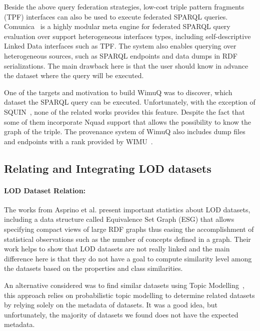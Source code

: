 \documentclass[sw]{iosart2x}
\begin{document}
Beside the above query federation strategies, low-cost triple pattern fragments (TPF) interfaces \cite{verborgh2016triple} can also be used to execute federated SPARQL queries.
Comunica~\cite{taelman2018comunica} is a highly modular meta engine for federated SPARQL query evaluation over support heterogeneous interfaces types, including self-descriptive Linked Data interfaces such as TPF.
The system also enables querying over heterogeneous sources, such as SPARQL endpoints and data dumps in RDF serializations.
The main drawback here is that the user should know in advance the dataset where the query will be executed.

One of the targets and motivation to build WimuQ was to discover, which dataset the SPARQL query can be executed.
Unfortunately, with the exception of SQUIN~\cite{hartig2013squin}, none of the related works provides this feature.
Despite the fact that some of them incorporate Nquad support that allows the possibility to know the graph of the triple.
The provenance system of WimuQ also includes dump files and endpoints with a rank provided by WIMU~\cite{valdestilhas2018my}.

\subsection{Relating and Integrating LOD datasets} \label{sec:relod_rel}

\paragraph*{\textbf{LOD Dataset Relation:}}
The works from Asprino et al. \cite{asprino2019linked,asprino2019observing,asprino2019triplifying} present important statistics about LOD datasets, including a data structure called Equivalence Set Graph (ESG) that allows specifying compact views of large RDF graphs thus easing the accomplishment of statistical observations such as the number of concepts defined in a graph.
Their work helps to show that LOD datasets are not really linked and the main difference here is that they do not have a goal to compute similarity level among the datasets based on the properties and class similarities.

An alternative considered was to find similar datasets using Topic Modelling~\cite{roder2016detecting}, this approach relies on probabilistic topic modelling to determine related datasets by relying solely on the metadata of datasets. It was a good idea, but unfortunately, the majority of datasets we found does not have the expected metadata. 
\end{document}
